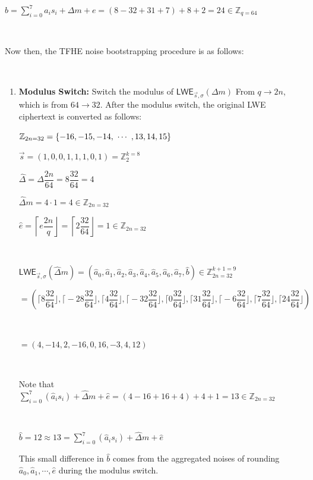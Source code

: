 $b = \sum\limits_{i=0}^{7}a_is_i + \Delta m + e = (8 -32 + 31 +7) + 8 + 2 = 24 \in \mathbb{Z}_{q=64}$

$ $

Now then, the TFHE noise bootstrapping procedure is as follows:

$ $

\begin{enumerate}
\item \textbf{Modulus Switch:} Switch the modulus of $\textsf{LWE}_{\vec{s}, \sigma}(\Delta m)$ From $q \rightarrow 2n$, which is from $64 \rightarrow 32$. After the modulus switch, the original LWE ciphertext is converted as follows:

$\mathbb{Z}_{2n=32} = \{-16, -15, -14, \text{ } \text{$\cdots$} \text{ }, 13, 14, 15\}$

$\vec{s} = (1, 0, 0, 1, 1, 1, 0, 1) = \mathbb{Z}_2^{k=8}$


$\hat{\Delta} = \Delta\dfrac{2n}{64} = 8\dfrac{32}{64} = 4$

$\hat{\Delta}m = 4 \cdot 1 = 4 \in \mathbb{Z}_{2n=32}$

$\hat{e} =  \left\lceil e \dfrac{2n}{q} \right\rfloor = \left\lceil 2\dfrac{32}{64} \right\rfloor = 1 \in \mathbb{Z}_{2n=32}$

$ $

$\textsf{LWE}_{\vec{s}, \sigma}(\hat{\Delta}m) = (\hat{a}_0, \hat{a}_1, \hat{a}_2, \hat{a}_3, \hat{a}_4, \hat{a}_5, \hat{a}_6, \hat{a}_7, \hat{b}) \in \mathbb{Z}_{2n=32}^{k+1=9}$


$ = (\Big\lceil 8\dfrac{32}{64} \Big\rfloor, \Big\lceil -28\dfrac{32}{64}\Big\rfloor, \Big\lceil 4\dfrac{32}{64}\Big\rfloor, \Big\lceil -32\dfrac{32}{64}\Big\rfloor, \Big\lceil 0\dfrac{32}{64}\Big\rfloor, \Big\lceil 31\dfrac{32}{64}\Big\rfloor, \Big\lceil -6\dfrac{32}{64}\Big\rfloor, \Big\lceil 7\dfrac{32}{64}\Big\rfloor, \Big\lceil 24\dfrac{32}{64}\Big\rfloor)$

$ $

$= (4, {-14}, 2, -16, 0, 16, {-3}, 4, 12)$

$ $

Note that $\sum\limits_{i=0}^{7}(\hat{a}_is_i) + \hat{\Delta}m + \hat{e} = (4 - 16 + 16 + 4) + 4 + 1 = 13 \in \mathbb{Z}_{2n=32}$

$ $

$\hat b = 12 \approx 13 = \sum\limits_{i=0}^{7}(\hat{a}_is_i) + \hat{\Delta}m + \hat{e}$

This small difference in $\hat b$ comes from the aggregated noises of rounding $\hat a_0, \hat a_1, \cdots , \hat e$ during the modulus switch. 



\end{enumerate}
